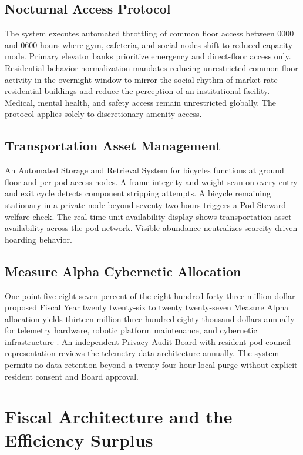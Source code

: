 \documentclass[12pt, letterpaper]{article}
\begin{document}
\subsection{Nocturnal Access Protocol}

The system executes automated throttling of common floor access between 0000 and 0600 hours where gym, cafeteria, and social nodes shift to reduced-capacity mode. Primary elevator banks prioritize emergency and direct-floor access only. Residential behavior normalization mandates reducing unrestricted common floor activity in the overnight window to mirror the social rhythm of market-rate residential buildings and reduce the perception of an institutional facility. Medical, mental health, and safety access remain unrestricted globally. The protocol applies solely to discretionary amenity access.

\subsection{Transportation Asset Management}

An Automated Storage and Retrieval System for bicycles functions at ground floor and per-pod access nodes. A frame integrity and weight scan on every entry and exit cycle detects component stripping attempts. A bicycle remaining stationary in a private node beyond seventy-two hours triggers a Pod Steward welfare check. The real-time unit availability display shows transportation asset availability across the pod network. Visible abundance neutralizes scarcity-driven hoarding behavior.

\subsection{Measure Alpha Cybernetic Allocation}

One point five eight seven percent of the eight hundred forty-three million dollar proposed Fiscal Year twenty twenty-six to twenty twenty-seven Measure Alpha allocation yields thirteen million three hundred eighty thousand dollars annually for telemetry hardware, robotic platform maintenance, and cybernetic infrastructure \citep{lac_ceo_measure_a_2025}. An independent Privacy Audit Board with resident pod council representation reviews the telemetry data architecture annually. The system permits no data retention beyond a twenty-four-hour local purge without explicit resident consent and Board approval.

\clearpage
\section{Fiscal Architecture and the Efficiency Surplus}
\end{document}
